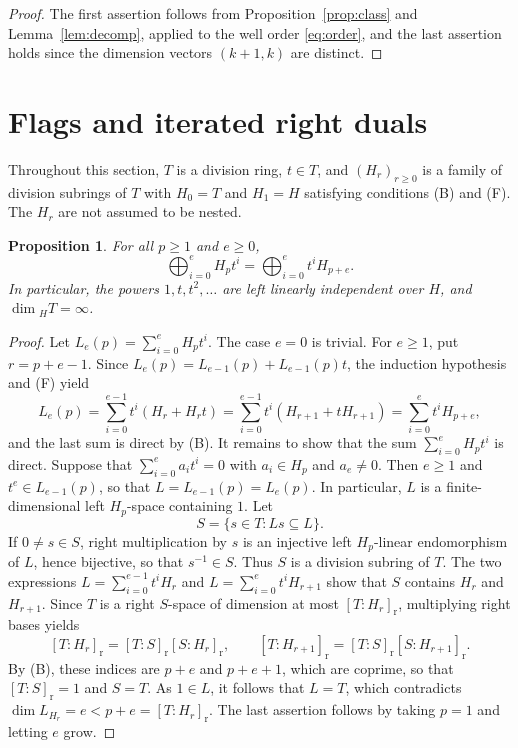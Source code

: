 \documentclass[11pt,a4paper]{amsart}
\newtheorem{proposition}[theorem]{Proposition}
\numberwithin{equation}{section}
\newcommand{\rr}{\mathrm{r}}
\begin{document}
\begin{proof}
The first assertion follows from Proposition~\ref{prop:class} and Lemma~\ref{lem:decomp}, applied to the well order \eqref{eq:order}, and the last assertion holds since the dimension vectors $(k+1,k)$ are distinct.
\end{proof}

\section{Flags and iterated right duals}\label{sec:flags}

Throughout this section, $T$ is a division ring, $t\in T$, and $(H_r)_{r\ge0}$ is a family of division subrings of $T$ with $H_0=T$ and $H_1=H$ satisfying conditions (B) and (F). The $H_r$ are not assumed to be nested.

\begin{proposition}\label{prop:flags}
For all $p\ge1$ and $e\ge0$,
\begin{equation}\label{eq:flags}
\textstyle\bigoplus_{i=0}^{e}H_pt^i=\bigoplus_{i=0}^{e}t^iH_{p+e}.
\end{equation}
In particular, the powers $1,t,t^2,\dots$ are left linearly independent over $H$, and $\dim{}_HT=\infty$.
\end{proposition}

\begin{proof}
Let $L_e(p)=\sum_{i=0}^{e}H_pt^i$. The case $e=0$ is trivial. For $e\ge1$, put $r=p+e-1$. Since $L_e(p)=L_{e-1}(p)+L_{e-1}(p)t$, the induction hypothesis and (F) yield
\[
L_e(p)=\sum_{i=0}^{e-1}t^i(H_r+H_rt)=\sum_{i=0}^{e-1}t^i(H_{r+1}+tH_{r+1})=\sum_{i=0}^{e}t^iH_{p+e},
\]
and the last sum is direct by (B). It remains to show that the sum $\sum_{i=0}^{e}H_pt^i$ is direct. Suppose that $\sum_{i=0}^{e}a_it^i=0$ with $a_i\in H_p$ and $a_e\ne0$. Then $e\ge1$ and $t^e\in L_{e-1}(p)$, so that $L=L_{e-1}(p)=L_e(p)$. In particular, $L$ is a finite-dimensional left $H_p$-space containing $1$. Let
\[
S=\{s\in T: Ls\subseteq L\}.
\]
If $0\ne s\in S$, right multiplication by $s$ is an injective left $H_p$-linear endomorphism of $L$, hence bijective, so that $s^{-1}\in S$. Thus $S$ is a division subring of $T$. The two expressions $L=\sum_{i=0}^{e-1}t^iH_r$ and $L=\sum_{i=0}^{e}t^iH_{r+1}$ show that $S$ contains $H_r$ and $H_{r+1}$. Since $T$ is a right $S$-space of dimension at most $[T:H_r]_{\rr}$, multiplying right bases yields
\[
[T:H_r]_{\rr}=[T:S]_{\rr}[S:H_r]_{\rr},\qquad [T:H_{r+1}]_{\rr}=[T:S]_{\rr}[S:H_{r+1}]_{\rr}.
\]
By (B), these indices are $p+e$ and $p+e+1$, which are coprime, so that $[T:S]_{\rr}=1$ and $S=T$. As $1\in L$, it follows that $L=T$, which contradicts $\dim L_{H_r}=e<p+e=[T:H_r]_{\rr}$. The last assertion follows by taking $p=1$ and letting $e$ grow.
\end{proof}
\end{document}
